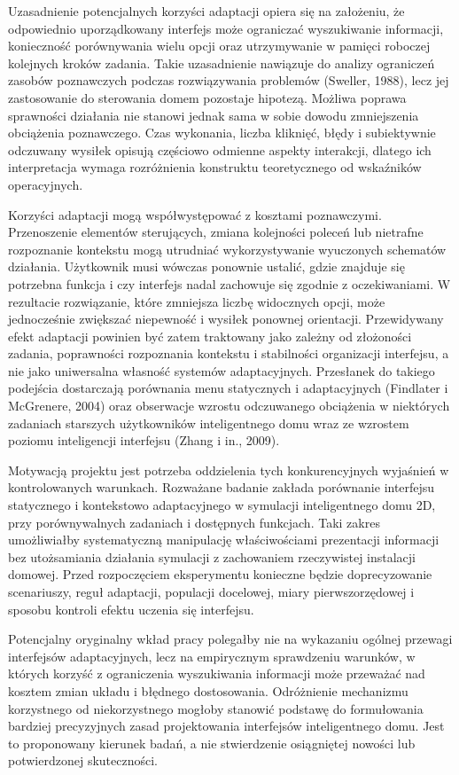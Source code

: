\documentclass[11pt,a4paper]{article}
\begin{document}
Uzasadnienie potencjalnych korzyści adaptacji opiera się na założeniu, że odpowiednio uporządkowany interfejs może ograniczać wyszukiwanie informacji, konieczność porównywania wielu opcji oraz utrzymywanie w pamięci roboczej kolejnych kroków zadania. Takie uzasadnienie nawiązuje do analizy ograniczeń zasobów poznawczych podczas rozwiązywania problemów (Sweller, 1988), lecz jej zastosowanie do sterowania domem pozostaje hipotezą. Możliwa poprawa sprawności działania nie stanowi jednak sama w sobie dowodu zmniejszenia obciążenia poznawczego. Czas wykonania, liczba kliknięć, błędy i subiektywnie odczuwany wysiłek opisują częściowo odmienne aspekty interakcji, dlatego ich interpretacja wymaga rozróżnienia konstruktu teoretycznego od wskaźników operacyjnych.

Korzyści adaptacji mogą współwystępować z kosztami poznawczymi. Przenoszenie elementów sterujących, zmiana kolejności poleceń lub nietrafne rozpoznanie kontekstu mogą utrudniać wykorzystywanie wyuczonych schematów działania. Użytkownik musi wówczas ponownie ustalić, gdzie znajduje się potrzebna funkcja i czy interfejs nadal zachowuje się zgodnie z oczekiwaniami. W rezultacie rozwiązanie, które zmniejsza liczbę widocznych opcji, może jednocześnie zwiększać niepewność i wysiłek ponownej orientacji. Przewidywany efekt adaptacji powinien być zatem traktowany jako zależny od złożoności zadania, poprawności rozpoznania kontekstu i stabilności organizacji interfejsu, a nie jako uniwersalna własność systemów adaptacyjnych. Przesłanek do takiego podejścia dostarczają porównania menu statycznych i adaptacyjnych (Findlater i McGrenere, 2004) oraz obserwacje wzrostu odczuwanego obciążenia w niektórych zadaniach starszych użytkowników inteligentnego domu wraz ze wzrostem poziomu inteligencji interfejsu (Zhang i in., 2009).

Motywacją projektu jest potrzeba oddzielenia tych konkurencyjnych wyjaśnień w kontrolowanych warunkach. Rozważane badanie zakłada porównanie interfejsu statycznego i kontekstowo adaptacyjnego w symulacji inteligentnego domu 2D, przy porównywalnych zadaniach i dostępnych funkcjach. Taki zakres umożliwiałby systematyczną manipulację właściwościami prezentacji informacji bez utożsamiania działania symulacji z zachowaniem rzeczywistej instalacji domowej. Przed rozpoczęciem eksperymentu konieczne będzie doprecyzowanie scenariuszy, reguł adaptacji, populacji docelowej, miary pierwszorzędowej i sposobu kontroli efektu uczenia się interfejsu.

Potencjalny oryginalny wkład pracy polegałby nie na wykazaniu ogólnej przewagi interfejsów adaptacyjnych, lecz na empirycznym sprawdzeniu warunków, w których korzyść z ograniczenia wyszukiwania informacji może przeważać nad kosztem zmian układu i błędnego dostosowania. Odróżnienie mechanizmu korzystnego od niekorzystnego mogłoby stanowić podstawę do formułowania bardziej precyzyjnych zasad projektowania interfejsów inteligentnego domu. Jest to proponowany kierunek badań, a nie stwierdzenie osiągniętej nowości lub potwierdzonej skuteczności.
\end{document}
